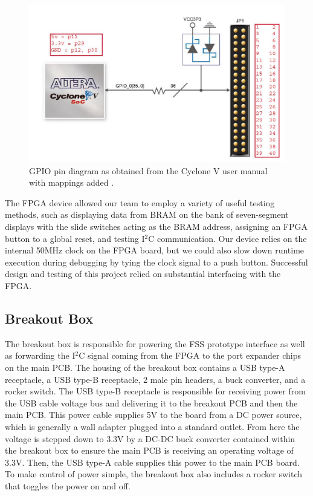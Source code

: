 \documentclass[conference]{IEEEtran}
\begin{document}
\begin{figure}[bhtp]
    \centering
    \includegraphics[scale=0.75]{./resources/figures/gpio_pin_map.jpg}
    \caption{GPIO pin diagram as obtained from the Cyclone V user manual with mappings added \cite{cite:de1-soc_manual}.}
    \label{fig:gpio_mapping}
\end{figure}

The FPGA device allowed our team to employ a variety of useful testing methods, such as displaying data from BRAM on the bank of seven-segment displays with the slide switches acting as the BRAM address, assigning an FPGA button to a global reset, and testing I$^2$C communication. Our device relies on the internal 50MHz clock on the FPGA board, but we could also slow down runtime execution during debugging by tying the clock signal to a push button. Successful design and testing of this project relied on substantial interfacing with the FPGA.

\subsection{Breakout Box}
The breakout box is responsible for powering the FSS prototype interface as well as forwarding the I$^2$C signal coming from the FPGA to the port expander chips on the main PCB. The housing of the breakout box contains a USB type-A receptacle, a USB type-B receptacle, 2 male pin headers, a buck converter, and a rocker switch. The USB type-B receptacle is responsible for receiving power from the USB cable voltage bus and delivering it to the breakout PCB and then the main PCB. This power cable supplies 5V to the board from a DC power source, which is generally a wall adapter plugged into a standard outlet. From here the voltage is stepped down to 3.3V by a DC-DC buck converter contained within the breakout box to ensure the main PCB is receiving an operating voltage of 3.3V. Then, the USB type-A cable supplies this power to the main PCB board. To make control of power simple, the breakout box also includes a rocker switch that toggles the power on and off.
\end{document}
